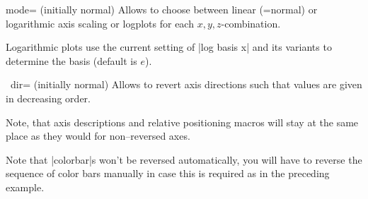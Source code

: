 \begin{pgfplotsxykey}{\x mode= (initially normal)}
	Allows to choose between linear (=normal) or logarithmic axis scaling or logplots for each $x,y,z$-combination.

	Logarithmic plots use the current setting of |log basis x| and its variants to determine the basis (default is $e$).
\end{pgfplotsxykey}

\begin{pgfplotsxykey}{\x\ dir= (initially normal)}
	Allows to revert axis directions such that values are given in decreasing order.
\label{key:pgfplots:xydir}
\begin{codeexample}[]
\end{codeexample}

\begin{codeexample}[]
\end{codeexample}

	Note, that axis descriptions and relative positioning macros will stay at the same place as they would for non--reversed axes.
\begin{codeexample}[]
\end{codeexample}

	Note that |colorbar|s won't be reversed automatically, you will have to reverse the sequence of color bars manually in case this is required as in the preceding example.
\end{pgfplotsxykey}


